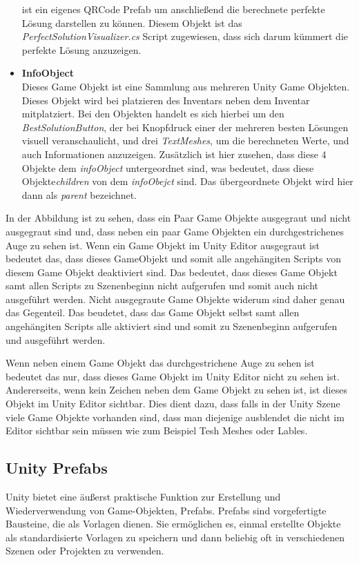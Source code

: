 \begin{itemize}
    ist ein eigenes QRCode Prefab um anschließend die berechnete perfekte Lösung darstellen zu können. Diesem Objekt ist
    das \textit{PerfectSolutionVisualizer.cs} Script zugewiesen, dass sich darum kümmert die perfekte Lösung anzuzeigen.
    \item \textbf{InfoObject}\\
    Dieses Game Objekt ist eine Sammlung aus mehreren Unity Game Objekten. Dieses Objekt wird bei platzieren
    des Inventars neben dem Inventar mitplatziert. Bei den Objekten handelt es sich hierbei um den \textit{BestSolutionButton},
    der bei Knopfdruck einer der mehreren besten Lösungen visuell veranschaulicht, und drei \textit{TextMeshes}, um die
    berechneten Werte, und auch Informationen anzuzeigen. Zusätzlich ist hier zusehen, dass diese 4 Objekte dem \textit{infoObject}
    untergeordnet sind, was bedeutet, dass diese Objekte\textit{children} von dem \textit{infoObejct} sind. Das übergeordnete
    Objekt wird hier dann als \textit{parent} bezeichnet.
\end{itemize}

In der Abbildung ist zu sehen, dass ein Paar Game Objekte ausgegraut und nicht ausgegraut sind und, dass neben ein paar Game Objekten ein durchgestrichenes Auge zu sehen ist.
Wenn ein Game Objekt im Unity Editor ausgegraut ist bedeutet das, dass dieses GameObjekt und somit alle angehängiten Scripts von diesem Game Objekt deaktiviert sind.
Das bedeutet, dass dieses Game Objekt samt allen Scripts zu Szenenbeginn nicht aufgerufen und somit auch nicht ausgeführt werden. Nicht ausgegraute Game Objekte widerum sind
daher genau das Gegenteil. Das beudetet, dass das Game Objekt selbst samt allen angehängiten Scripts alle aktiviert sind und somit zu Szenenbeginn aufgerufen und ausgeführt werden.

Wenn neben einem Game Objekt das durchgestrichene Auge zu sehen ist bedeutet das nur, dass dieses Game Objekt im Unity Editor nicht zu sehen ist. Andererseits, wenn kein Zeichen
neben dem Game Objekt zu sehen ist, ist dieses Objekt im Unity Editor sichtbar. Dies dient dazu, dass falls in der Unity Szene viele Game Objekte vorhanden sind, dass man
diejenige ausblendet die nicht im Editor sichtbar sein müssen wie zum Beispiel Tesh Meshes oder Lables.

\subsection{Unity Prefabs}
Unity bietet eine äußerst praktische Funktion zur Erstellung und Wiederverwendung von Game-Objekten, Prefabs. Prefabs sind
vorgefertigte Bausteine, die als Vorlagen dienen. Sie ermöglichen es, einmal erstellte Objekte als standardisierte Vorlagen
zu speichern und dann beliebig oft in verschiedenen Szenen oder Projekten zu verwenden.

